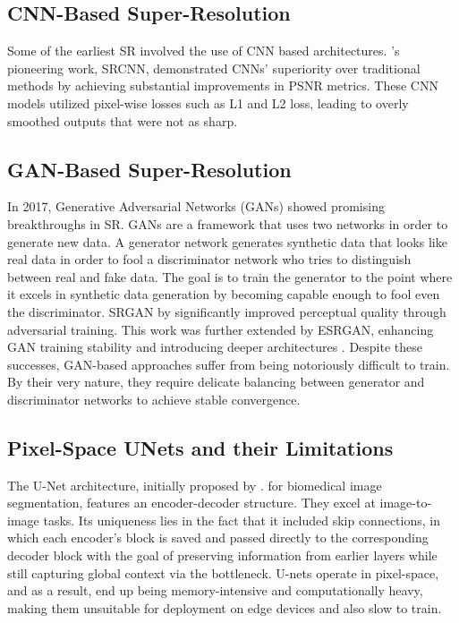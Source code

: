 \documentclass{article} %
\begin{document}
\subsection{CNN-Based Super-Resolution}

Some of the earliest SR involved the use of CNN based architectures. \citet{dong2015cnn}'s pioneering work, SRCNN, demonstrated CNNs' superiority over traditional methods by achieving substantial improvements in PSNR metrics. These CNN models utilized pixel-wise losses such as L1 and L2 loss, leading to overly smoothed outputs that were not as sharp.

\subsection{GAN-Based Super-Resolution}

In 2017, Generative Adversarial Networks (GANs) showed promising breakthroughs in SR. GANs are a framework that uses two networks in order to generate new data. A generator network generates synthetic data that looks like real data in order to fool a discriminator network who tries to distinguish between real and fake data. The goal is to train the generator to the point where it excels in synthetic data generation by becoming capable enough to fool even the discriminator. SRGAN by \citet{ledig2017gan} significantly improved perceptual quality through adversarial training. This work was further extended by ESRGAN, enhancing GAN training stability and introducing deeper architectures \citep{wang2018esrgan} .
Despite these successes, GAN-based approaches suffer from being notoriously difficult to train. By their very nature, they require delicate balancing between generator and discriminator networks to achieve stable convergence.

\subsection{Pixel-Space UNets and their Limitations}

The U-Net architecture, initially proposed by \citet{ronneberger2015unet}. for biomedical image segmentation, features an encoder-decoder structure. They excel at image-to-image tasks. Its uniqueness lies in the fact that it included skip connections, in which each encoder’s block is saved and passed directly to the corresponding decoder block with the goal of preserving information from earlier layers while still capturing global context via the bottleneck.  U-nets operate in pixel-space, and as a result, end up being memory-intensive and computationally heavy, making them unsuitable for deployment on edge devices and also slow to train.
\end{document}
